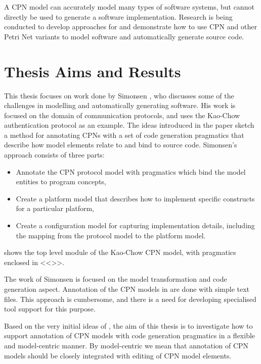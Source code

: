A CPN model can accurately model many types of software systems, but cannot
directly be used to generate a software implementation. Research is being
conducted to develop approaches for and demonstrate how to use CPN and other
Petri Net variants to model software and automatically generate source code.


\section{Thesis Aims and Results}
This thesis focuses on work done by Simonsen \cite{Simonsen2011}, who discusses
some of the challenges in modelling and automatically generating software. His
work is focused on the domain of communication protocols, and uses the Kao-Chow
authentication protocol as an example.
The ideas introduced in the paper sketch a method for annotating CPNs with a
set of code generation pragmatics that describe how model elements relate to and
bind to source code. Simonsen's approach consists of three parts: 
\begin{itemize}
	\item Annotate the CPN protocol model with pragmatics which bind the model
	entities to program concepts,
	\item Create a platform	model that describes how to implement specific
	constructs for a particular platform,
	\item Create a configuration model for capturing implementation details,
	including the mapping from the protocol model to the platform model.   
\end{itemize}  


 shows the top level module of the Kao-Chow CPN model, with
pragmatics enclosed in \textless\textless\textgreater\textgreater.

The work of Simonsen \cite{Simonsen2011} is focused on the model transformation
and code generation aspect. Annotation of the CPN models in \cite{Simonsen2011}
are done with simple text files. This approach is cumbersome, and there is a
need for developing specialised tool support for this purpose.

Based on the very initial ideas of \cite{Simonsen2011}, the aim of this thesis
is to investigate how to support annotation of CPN models with code generation
pragmatics in a flexible and model-centric manner. By model-centric we mean that
annotation of CPN models should be closely integrated with editing of CPN model
elements.

